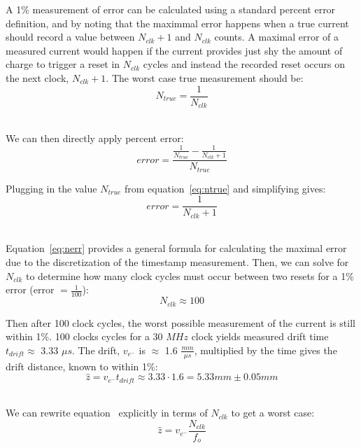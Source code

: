 A 1\% measurement of error can be calculated using a standard percent error definition, and by noting that the maximmal error happens when a true current should record a value between $N_{clk}+1$ and $N_{clk}$ counts.
A maximal error of a measured current would happen if the current provides just shy the amount of charge to trigger a reset in $N_{clk}$ cycles and instead the recorded reset occurs on the next clock, $N_{clk} + 1$.
The worst case true measurement should be:
\begin{equation}
  N_{true} = \frac{1}{N_{clk}}
\end{equation}~\label{eq:ntrue}

We can then directly apply percent error:
\begin{equation}
  error = \frac{\frac{1}{N_{true}} - \frac{1}{N_{clk}+1}}{N_{true}}
\end{equation}

Plugging in the value $N_{true}$ from equation~\ref{eq:ntrue} and simplifying gives:
\begin{equation}
  error = \frac{1}{N_{clk}+1}
\end{equation}~\label{eq:nerr}

Equation~\ref{eq:nerr} provides a general formula for calculating the maximal error due to the discretization of the timestamp measurement.
Then, we can solve for $N_{clk}$ to determine how many clock cycles must occur between two resets for a 1\% error (error $= \frac{1}{100}$):
\begin{equation}
  N_{clk} \approx 100
\end{equation}

Then after 100 clock cycles, the worst possible measurement of the current is still within 1\%.
100 clocks cycles for a 30 $\unit{MHz}$ clock yields measured drift time $t_{drift} \approx$ 3.33 $\unit{\mu s}$.
The drift, $v_{e^{-}}$ is $\approx$ 1.6 $\unit{\frac{mm}{\mu s}}$, multiplied by the time gives the drift distance, known to within 1\%:
\begin{equation}
  \hat{z} = v_{e^{-}}t_{drift} \approx 3.33 \cdot 1.6 = 5.33 \unit{mm} \pm 0.05 \unit{mm}
\end{equation}~\label{eq:zdriftnclk}

We can rewrite equation~\label{eq:zdriftnclk} explicitly in terms of $N_{clk}$ to get a worst case:
\begin{equation}
  \hat{z} = v_{e^{-}}\frac{N_{clk}}{f_{o}}
\end{equation}~\label{eq:zdriftworse}

